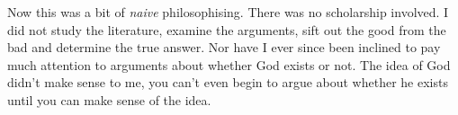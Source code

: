 Now this was a bit of {\it naive} philosophising.
There was no scholarship involved.
I did not study the literature, examine the arguments, sift out the good from the bad and determine the true answer.
Nor have I ever since been inclined to pay much attention to arguments about whether God exists or not.
The idea of God didn't make sense to me, you can't even begin to argue about whether he exists until you can make sense of the idea.

